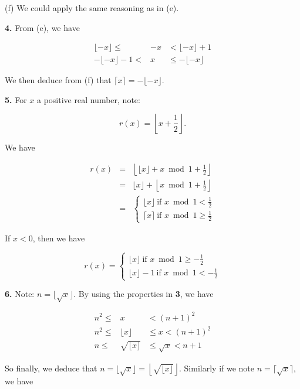 \documentclass[a4paper,12pt]{article}
\newcommand{\newpar}[1]{\bigskip \noindent \textbf{#1.}}
\newcommand{\subpar}[1]{\medskip \noindent (#1)}
\begin{document}
\medskip
\subpar{f} We could apply the same reasoning as in (e).

\newpar{4}  From (e), we have

\begin{eqnarray*}
  \lfloor -x\rfloor \le &-x& < \lfloor -x\rfloor + 1 \\
  -\lfloor -x\rfloor - 1 < &x& \le - \lfloor -x\rfloor
\end{eqnarray*}

We then deduce from (f) that $\lceil x\rceil = -\lfloor -x\rfloor$.

\newpar{5} For $x$ a positive real number, note:

\[ r(x) = \left\lfloor x + \frac{1}{2}\right\rfloor.\]

We have

\begin{eqnarray*}
  r(x) &=& \left\lfloor \lfloor x\rfloor + x \bmod{1} +
  \frac{1}{2}\right\rfloor \\
  &=& \lfloor x\rfloor + \left\lfloor x \bmod 1 +
  \frac{1}{2}\right\rfloor \\
  &=& \left\{
    \begin{array}{l}
      \lfloor x \rfloor\ \mbox{if $x \bmod 1 < \frac{1}{2}$} \\
      \lceil x \rceil\ \mbox{if $x \bmod 1\ge \frac{1}{2}$}
    \end{array}
    \right.
\end{eqnarray*}

If $x < 0$, then we have

\[
r(x) = \left\{
\begin{array}{l}
  \lfloor x \rfloor\ \mbox{if $x \bmod 1 \ge -\frac{1}{2}$}\\
  \lfloor x \rfloor - 1\ \mbox{if $x \bmod 1 < -\frac{1}{2}$}
\end{array}
\right.
\]

\newpar{6}  Note: $n = \lfloor \sqrt x\rfloor$.  By using the
properties in \textbf{3}, we have

\begin{eqnarray*}
  n^2 \le & x & < (n+1)^2 \\
  n^2 \le & \lfloor x \rfloor & \le x < (n+1)^2 \\
  n \le & \sqrt{\lfloor x\rfloor} & \le \sqrt{x} < n+1
\end{eqnarray*}

So finally, we deduce that $n = \lfloor\sqrt{x}\rfloor =
\left\lfloor\sqrt{\lfloor x\rfloor}\right\rfloor$.  Similarly if we
note $n = \lceil \sqrt{x}\rceil$, we have
\end{document}
